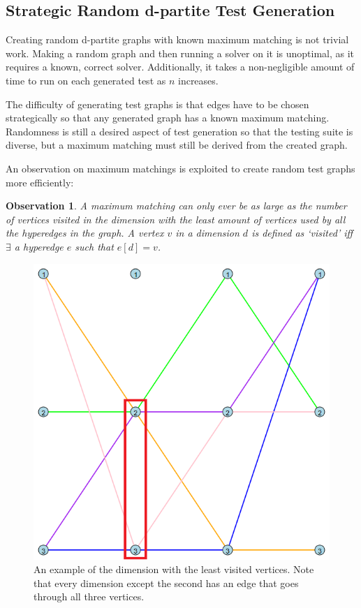 \subsection{Strategic Random d-partite Test Generation}
Creating random d-partite graphs with known maximum matching is not trivial work. 
Making a random graph and then running a solver on it is unoptimal, as it requires 
a known, correct solver. Additionally, it takes a non-negligible amount of time to
run on each generated test as $n$ increases.

The difficulty of generating test graphs is that edges have to be chosen strategically 
so that any generated graph has a known maximum matching. Randomness is still a desired 
aspect of test generation so that the testing suite is diverse, but a maximum matching
must still be derived from the created graph. 

An observation on maximum matchings is exploited to create random test graphs 
more efficiently: 
\newtheorem{observation}{Observation}
\begin{observation}
A maximum matching can only ever be as large as the number of vertices
visited in the dimension with the least amount of vertices used by all the hyperedges in 
the graph. A vertex $v$ in a dimension $d$ is defined as `visited' iff $\exists$ a hyperedge $e$
such that $e[d] = v$.
\end{observation}

\begin{figure}[t!]
    \centering
    \begin{minipage}{0.45\textwidth}
        \centering
        \includegraphics[width=\textwidth]{images/basic.png}
        \caption{An example of the dimension with the least visited vertices. Note that 
        every dimension except the second has an edge that goes through all three vertices.}
        \label{fig:image1}
    \end{minipage}
    \hfill
\end{figure}

